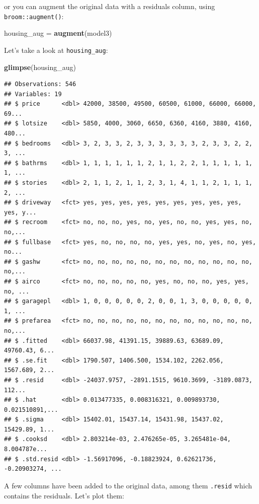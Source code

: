 \documentclass[]{gitbook}
\newenvironment{Shaded}{\begin{snugshade}}{\end{snugshade}}
\newcommand{\KeywordTok}[1]{\textcolor[rgb]{0.13,0.29,0.53}{\textbf{#1}}}
\newcommand{\NormalTok}[1]{#1}
\newcommand{\StringTok}[1]{\textcolor[rgb]{0.31,0.60,0.02}{#1}}
\theoremstyle{definition}
\theoremstyle{definition}
\theoremstyle{definition}
\theoremstyle{remark}
\begin{document}
or you can augment the original data with a residuals column, using
\texttt{broom::augment()}:

\begin{Shaded}
\begin{Highlighting}[]
\NormalTok{housing_aug =}\StringTok{ }\KeywordTok{augment}\NormalTok{(model3)}
\end{Highlighting}
\end{Shaded}

Let's take a look at \texttt{housing\_aug}:

\begin{Shaded}
\begin{Highlighting}[]
\KeywordTok{glimpse}\NormalTok{(housing_aug)}
\end{Highlighting}
\end{Shaded}

\begin{verbatim}
## Observations: 546
## Variables: 19
## $ price      <dbl> 42000, 38500, 49500, 60500, 61000, 66000, 66000, 69...
## $ lotsize    <dbl> 5850, 4000, 3060, 6650, 6360, 4160, 3880, 4160, 480...
## $ bedrooms   <dbl> 3, 2, 3, 3, 2, 3, 3, 3, 3, 3, 3, 2, 3, 3, 2, 2, 3, ...
## $ bathrms    <dbl> 1, 1, 1, 1, 1, 1, 2, 1, 1, 2, 2, 1, 1, 1, 1, 1, 1, ...
## $ stories    <dbl> 2, 1, 1, 2, 1, 1, 2, 3, 1, 4, 1, 1, 2, 1, 1, 1, 2, ...
## $ driveway   <fct> yes, yes, yes, yes, yes, yes, yes, yes, yes, yes, y...
## $ recroom    <fct> no, no, no, yes, no, yes, no, no, yes, yes, no, no,...
## $ fullbase   <fct> yes, no, no, no, no, yes, yes, no, yes, no, yes, no...
## $ gashw      <fct> no, no, no, no, no, no, no, no, no, no, no, no, no,...
## $ airco      <fct> no, no, no, no, no, yes, no, no, no, yes, yes, no, ...
## $ garagepl   <dbl> 1, 0, 0, 0, 0, 0, 2, 0, 0, 1, 3, 0, 0, 0, 0, 0, 1, ...
## $ prefarea   <fct> no, no, no, no, no, no, no, no, no, no, no, no, no,...
## $ .fitted    <dbl> 66037.98, 41391.15, 39889.63, 63689.09, 49760.43, 6...
## $ .se.fit    <dbl> 1790.507, 1406.500, 1534.102, 2262.056, 1567.689, 2...
## $ .resid     <dbl> -24037.9757, -2891.1515, 9610.3699, -3189.0873, 112...
## $ .hat       <dbl> 0.013477335, 0.008316321, 0.009893730, 0.021510891,...
## $ .sigma     <dbl> 15402.01, 15437.14, 15431.98, 15437.02, 15429.89, 1...
## $ .cooksd    <dbl> 2.803214e-03, 2.476265e-05, 3.265481e-04, 8.004787e...
## $ .std.resid <dbl> -1.56917096, -0.18823924, 0.62621736, -0.20903274, ...
\end{verbatim}

A few columns have been added to the original data, among them
\texttt{.resid} which contains the residuals. Let's plot them:
\end{document}
